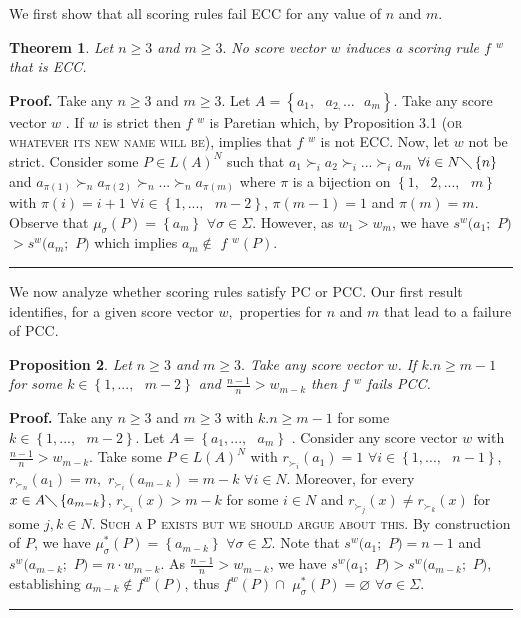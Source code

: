 \documentclass{article}
\newtheorem{theorem}{Theorem}
\newtheorem{proposition}[theorem]{Proposition}
\newenvironment{proof}[1][Proof]{\noindent\textbf{#1.} }{\ \rule{0.5em}{0.5em}}
\begin{document}
We first show that all scoring rules fail ECC for any value of $n$ and $m.$

\begin{theorem}
Let $n\geq 3$ and $m\geq 3.$ No score vector $w$ induces a scoring rule $f$ $%
^{w}$ that is ECC.
\end{theorem}

\begin{proof}
Take any $n\geq 3$ and $m\geq 3.$ Let $A=\left\{ a_{1},\text{ }a_{2,}...%
\text{ }a_{m}\right\} $. Take any score vector $w$ . If $w$ is strict then $%
f $ $^{w}$ is Paretian which, by Proposition 3.1 \textsc{(or whatever its
new name will be)}, implies that $f$ $^{w}$ is not ECC. Now, let $w$ not be
strict. Consider some $P\in L(A)^{N}$ such that $a_{1}\succ _{i}a_{2}\succ
_{i}...\succ _{i}a_{m}$ $\forall i\in N\diagdown \left\{ n\right\} $ and $%
a_{\pi (1)}\succ _{n}a_{\pi (2)}\succ _{n}...\succ _{n}a_{\pi (m)}$ where $%
\pi $ is a bijection on $\left\{ 1,\text{ }2,...,\text{ }m\right\} $ with $%
\pi (i)=i+1$ $\forall i\in \left\{ 1,...,\text{ }m-2\right\} $, $\pi (m-1)=1$
and $\pi (m)=m$. Observe that $\mu _{\sigma }(P)=\left\{ a_{m}\right\} $ $%
\forall \sigma \in \Sigma $. However, as $w_{1}>w_{m}$, we have $%
s^{w}(a_{1}; $ $P)$ $>s^{w}(a_{m};$ $P)$ which implies $a_{m}\notin $ $f$ $%
^{w}(P)$.
\end{proof}

We now analyze whether scoring rules satisfy PC or PCC. Our first result
identifies, for a given score vector $w,$ properties for $n$ and $m$ that
lead to a failure of PCC.

\begin{proposition}
\label{whenPCCfails} Let $n\geq 3$ and $m\geq 3.$ Take any score vector $w$.
If $k.n\geq m-1$ for some $k\in \left\{ 1,...,\text{ }m-2\right\} $ and $%
\frac{n-1}{n}>w_{m-k}$ then $f$ $^{w}$ fails PCC.
\end{proposition}

\begin{proof}
Take any $n\geq 3$ and $m\geq 3$ with $k.n\geq m-1$ for some $k\in \left\{
1,...,\text{ }m-2\right\} $. Let $A=\left\{ a_{1},...,\text{ }a_{m}\right\} $%
. Consider any score vector $w$ with $\frac{n-1}{n}>w_{m-k}$. Take some $%
P\in L(A)^{N}$ with $r_{\succ _{i}}(a_{1})=1$ $\forall i\in \left\{ 1,...,%
\text{ }n-1\right\} $, $r_{\succ _{n}}(a_{1})=m,$ $r_{\succ
_{i}}(a_{m-k})=m-k$ $\forall i\in N.$ Moreover, for every $x\in A\diagdown
\left\{ a_{m-k}\right\} $, $r_{\succ _{i}}(x)>m-k$ for some $i\in N$ and $%
r_{\succ _{j}}(x)\neq r_{\succ _{k}}(x)$ for some $j,k\in N$. \textsc{Such a
P exists but we should argue about this. }By construction of $P$, we have $%
\mu _{\sigma }^{\ast }(P)=\left\{ a_{m-k}\right\} $ $\forall \sigma \in
\Sigma $. Note that $s^{w}(a_{1};$ $P)=n-1$ and $s^{w}(a_{m-k};$ $P)=n\cdot
w_{m-k}$. As $\frac{n-1}{n}>w_{m-k}$, we have $s^{w}(a_{1};$ $%
P)>s^{w}(a_{m-k};$ $P)$, establishing $a_{m-k}\notin f^{w}(P)$, thus $%
f^{w}(P)\cap $ $\mu _{\sigma }^{\ast }(P)=\varnothing $ $\forall \sigma \in
\Sigma $.
\end{proof}
\end{document}
